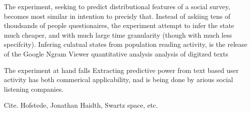 The experiment, seeking to predict distributional features of a social survey, becomes most similar in intention to precisly that.
Instead of askiing tens of thoudsands of people questionaires,
the experiment attempt to infer the state much cheaper, and with much large time granularity (though with much less specifcity).
Infering culatual states from population reading activity,
is
 the release of the Google Ngram Viewer quantitative analysis analysis of digitzed texts


The experiment at hand falls 
Extracting predictive power from text based user activity has both commerical applicability, nad is being done by arious social listening companies.

Cite. Hofstede, Jonathan Haidth, Swartz space, etc.
